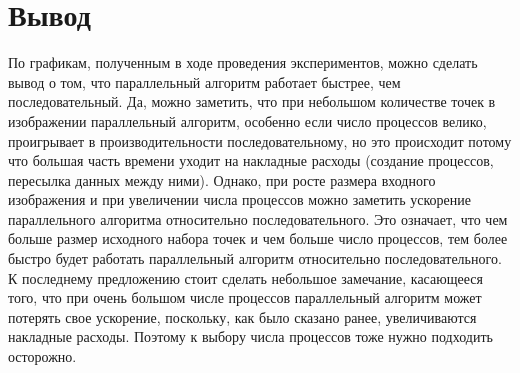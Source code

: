 \section{Вывод}
По графикам, полученным в ходе проведения экспериментов, можно сделать вывод о том, что параллельный алгоритм работает быстрее, чем последовательный.\n
Да, можно заметить, что при небольшом количестве точек в изображении параллельный алгоритм, особенно если число процессов велико, проигрывает в производительности последовательному, но это происходит потому что большая часть времени уходит на накладные расходы (создание процессов, пересылка данных между ними).\n
Однако, при росте размера входного изображения и при увеличении числа процессов можно заметить ускорение параллельного алгоритма относительно последовательного. Это означает, что чем больше размер исходного набора точек и чем больше число процессов, тем более быстро будет работать параллельный алгоритм относительно последовательного.\n
К последнему предложению стоит сделать небольшое замечание, касающееся того, что при очень большом числе процессов параллельный алгоритм может потерять свое ускорение, поскольку, как было сказано ранее, увеличиваются накладные расходы. Поэтому к выбору числа процессов тоже нужно подходить осторожно.